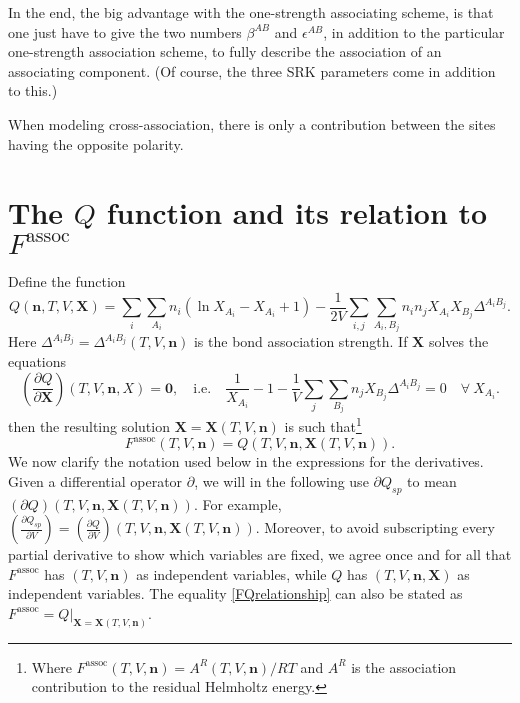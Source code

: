 \documentclass[10pt, a4paper]{article}
\newcommand{\mbf}[0]{\mathbf}
\newcommand*{\pder}[2]{\left(\frac{\partial #1}{\partial #2}\right)}
\newcommand{\lp}{\left(}
\newcommand{\rp}{\right)}
\begin{document}
In the end, the big advantage with the one-strength associating scheme, is that one just have to give the two numbers $\beta^{A B}$ and $\epsilon^{A B}$, in addition to the particular one-strength association scheme, to fully describe the association of an associating component. (Of course, the three SRK parameters come in addition to this.)

When modeling cross-association, there is only a contribution between the sites having the opposite polarity.

\section{The $Q$ function and its relation to $F^{\text{assoc}}$}
Define the function
\begin{equation}
  Q(\mbf n,T,V,\mathbf{X}) = \sum_i \sum_{A_i} n_i \lp \ln X_{A_i} - X_{A_i} + 1\rp - \frac{1}{2V} \sum_{i,j} \sum_{A_i, B_j} n_i n_j X_{A_i} X_{B_j} \Delta^{A_i B_j}.
\end{equation}
Here $\Delta^{A_i B_j} = \Delta^{A_i B_j}(T,V,\mbf n)$ is the bond association strength. If $\mbf X$ solves the equations
\begin{equation}
  \pder{Q}{\mbf X}(T,V,\mbf n,X) = \mbf 0, \quad \text{i.e.} \quad   \frac{1}{X_{A_i}} - 1 - \frac{1}{V} \sum_j \sum_{B_j} n_j X_{B_j} \Delta^{A_i B_j} = 0 \quad \forall \ X_{A_i}.
\end{equation}
then the resulting solution $\mbf X = \mbf X(T,V,\mbf n)$ is such that\footnote{Where $F^{\text{assoc}}(T,V,\mbf n) = A^{R}(T,V,\mbf n)/RT$ and $A^R$ is the association contribution to the residual Helmholtz energy.}
\begin{equation}
  \label{FQrelationship}
  F^{\text{assoc}}(T,V,\mbf n) = Q(T,V,\mbf n, \mbf X(T,V,\mbf n)).
\end{equation}
We now clarify the notation used below in the expressions for the derivatives. Given a differential operator $\partial$, we will in the following use $\partial Q_{sp}$ to mean $(\partial Q)(T,V,\mbf n,\mbf X(T,V,\mbf n))$. For example, $\pder{Q_{sp}}{V} = \pder{Q}{V}(T,V,\mbf n,\mbf X(T,V,\mbf n))$. Moreover, to avoid subscripting every partial derivative to show which variables are fixed, we agree once and for all that $F^{\text{assoc}}$ has $(T,V,\mbf n)$ as independent variables, while $Q$ has $(T,V,\mbf n,\mbf X)$ as independent variables. The equality \eqref{FQrelationship} can also be stated as $F^{\text{assoc}} = Q|_{\mbf X = \mbf X(T,V,\mbf n)}$.
\end{document}
